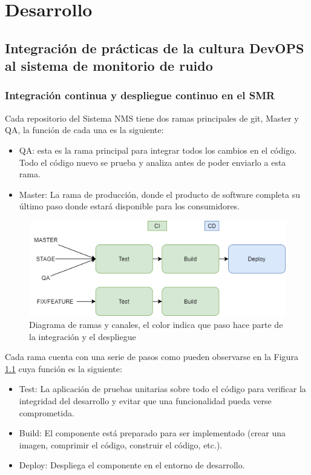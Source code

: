 \chapter{Desarrollo}
\section{Integración de prácticas de la cultura DevOPS al sistema de monitorio de ruido}
\subsection{Integración continua y despliegue continuo en el SMR}

Cada repositorio del Sistema NMS tiene dos ramas principales de git, Master y QA, la función de cada una es la siguiente:

\begin {itemize}
\item QA: esta es la rama principal para integrar todos los cambios en el código. Todo el código nuevo se prueba y analiza antes de poder enviarlo a esta rama.
\item Master: La rama de producción, donde el producto de software completa su último paso donde estará disponible para los consumidores.
\end {itemize}

\begin{figure}[H]
	\centering
	\includegraphics[width=\linewidth]{bibliografia/Imagenes/ci_cd branch Diagram.png}
	\caption{Diagrama de ramas y canales, el color indica que paso hace parte de la integración y el despliegue}
	\label{pipelines}
\end{figure}

Cada rama cuenta con  una serie de pasos como pueden observarse en la Figura \ref{pipelines} cuya función es la siguiente:
\begin{itemize}
\item Test: La aplicación de pruebas unitarias sobre todo el código para verificar la integridad del desarrollo y evitar que una funcionalidad pueda verse comprometida.
\item Build: El componente está preparado para ser implementado (crear una imagen, comprimir el código, construir el código, etc.).
\item Deploy: Despliega el componente en el entorno de desarrollo.
\end{itemize}

